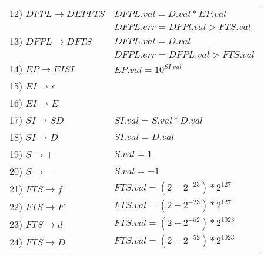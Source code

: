 \begin{tabular}{l|l}
12) $DFPL \rightarrow D EP FTS$ 	& $DFPL.val = D.val * EP.val$		\\
				& $DFPL.err = DFPl.val > FTS.val$	\\
13) $DFPL \rightarrow D FTS$ 	& $DFPL.val = D.val$			\\
				& $DFPL.err = DFPL.val > FTS.val$	\\
14) $EP	\rightarrow EI SI$ & $EP.val =	10^{SI.val}$		\\
15) $EI	\rightarrow e$	& 					\\
16) $EI	\rightarrow E$ & 					\\
17) $SI	\rightarrow S D$ & $SI.val = S.val * D.val$ 		\\
18) $SI	\rightarrow D$ & $SI.val = D.val$ 			\\
19) $S	\rightarrow +$ & $S.val = 1$				\\
20) $S	\rightarrow -$	& $S.val = -1$				\\
21) $FTS	\rightarrow f$ & $FTS.val = (2-2^{-23})*2^{127}$	\\
22) $FTS	\rightarrow F$ & $FTS.val = (2-2^{-23})*2^{127}$	\\
23) $FTS	\rightarrow d$ & $FTS.val = (2-2^{-52})*2^{1023}$	\\
24) $FTS	\rightarrow D$ & $FTS.val = (2-2^{-52})*2^{1023}$ 
 
\end{tabular}
